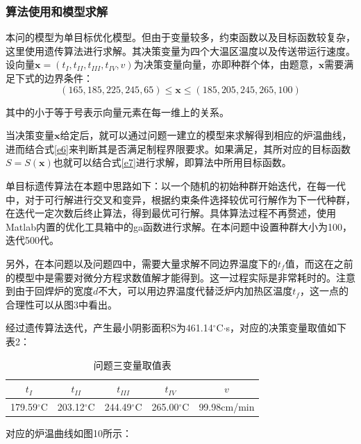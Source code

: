 \documentclass[a4paper,12pt]{ctexart} %
\begin{document}
	\subsubsection{算法使用和模型求解}
	本问的模型为单目标优化模型。但由于变量较多，约束函数以及目标函数较复杂，这里使用遗传算法进行求解。其决策变量为四个大温区温度以及传送带运行速度。设向量$\boldsymbol x = (t_{I},t_{II},t_{III},t_{IV},v)$为决策变量向量，亦即种群个体，由题意，$\boldsymbol x$需要满足下式的边界条件：
	\begin{equation}
	\label{e5}
	(165,185,225,245,65) \leqslant \boldsymbol x \leqslant (185,205,245,265,100)
	\end{equation}\par
	其中的小于等于号表示向量元素在每一维上的关系。\par
	当决策变量$\boldsymbol x$给定后，就可以通过问题一建立的模型来求解得到相应的炉温曲线，进而结合式\ref{e6}来判断其是否满足制程界限要求。如果满足，其所对应的目标函数$S = S(\boldsymbol{x})$也就可以结合式\ref{e7}进行求解，即算法中所用目标函数。\par
	单目标遗传算法在本题中思路如下：以一个随机的初始种群开始迭代，在每一代中，对于可行解进行交叉和变异，根据约束条件选择较优可行解作为下一代种群，在迭代一定次数后终止算法，得到最优可行解。具体算法过程不再赘述，使用Matlab内置的优化工具箱中的ga函数进行求解。在本问题中设置种群大小为100，迭代500代。\par
	另外，在本问题以及问题四中，需要大量求解不同边界温度下的$t_f$值，而这在之前的模型中是需要对微分方程求数值解才能得到。这一过程实际是非常耗时的。注意到由于回焊炉的宽度$d$不大，可以用边界温度代替泛炉内加热区温度$t_f$，这一点的合理性可以从图3中看出。\par
	经过遗传算法迭代，产生最小阴影面积S为461.14$^\circ$C$\cdot$s，对应的决策变量取值如下表2：
	\begin{table}[h]
		\centering
		\caption{问题三变量取值表}
		\begin{tabular}{ccccc }
			\toprule
			$t_{I}$ & $t_{II}$ & $t_{III}$ & $t_{IV}$ & $v$\\ \midrule
			179.59$^\circ$C & 203.12$^\circ$C & 244.49$^\circ$C & 265.00$^\circ$C & 99.98cm/min\\
			\bottomrule 
		\end{tabular}
		\label{t1}
	\end{table}\par	
	对应的炉温曲线如图10所示：\par
\end{document}
